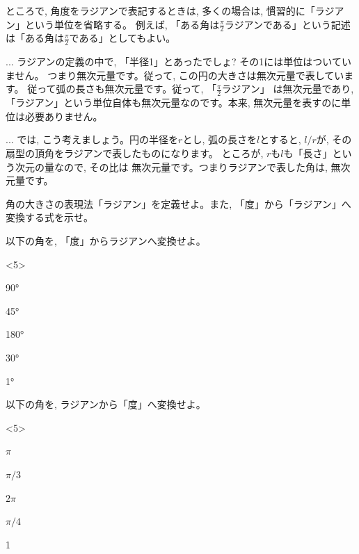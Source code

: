 ところで, 角度をラジアンで表記するときは, 多くの場合は, 慣習的に「ラジアン」という単位を省略する。
例えば, 「ある角は$\frac{\pi}{2}$ラジアンである」という記述は「ある角は$\frac{\pi}{2}$である」としてもよい。

\begin{faq}{\small{} ... 
ラジアンの定義の中で, 「半径1」とあったでしょ? その1には単位はついていません。
つまり無次元量です。従って, この円の大きさは無次元量で表しています。
従って弧の長さも無次元量です。従って, 「$\frac{\pi}{2}$ラジアン」
は無次元量であり, 「ラジアン」という単位自体も無次元量なのです。本来, 
無次元量を表すのに単位は必要ありません。}
\end{faq}\mv

\begin{faq}{\small{} ... 
では, こう考えましょう。円の半径を$r$とし, 弧の長さを$l$とすると, 
$l/r$が, その扇型の頂角をラジアンで表したものになります。
ところが, $r$も$l$も「長さ」という次元の量なので, その比は
無次元量です。つまりラジアンで表した角は, 無次元量です。}
\end{faq}\mv


\begin{q}\label{q:trig_rad_def} 
角の大きさの表現法「ラジアン」を定義せよ。また, 「度」から「ラジアン」へ変換する式を示せ。
\end{q}\mv

\begin{q}\label{q:trig_deg2rad} 以下の角を, 「度」からラジアンへ変換せよ。
\begin{edaenumerate}<5>
\item 90°
\item 45°
\item 180°
\item 30°
\item 1°
\end{edaenumerate}\end{q}\hv

\begin{q}\label{q:trig_rad2deg} 以下の角を, ラジアンから「度」へ変換せよ。
\begin{edaenumerate}<5>
\item $\pi$
\item $\pi/3$
\item $2\pi$
\item $\pi/4$
\item 1
\end{edaenumerate}\end{q}
\mv

